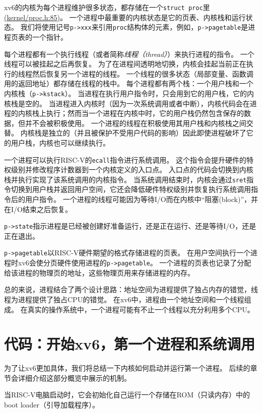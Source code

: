 xv6的内核为每个进程维护很多状态，都存储在一个\texttt{struct proc}里\href{https://github.com/mit-pdos/xv6-riscv/blob/riscv/kernel/proc.h#L85}{(kernel/proc.h:85)}。
一个进程中最重要的内核状态是它的页表、内核栈和运行状态。
我们将使用记号\texttt{p->xxx}来引用\texttt{proc}结构体的元素，例如，\texttt{p->pagetable}是进程页表的一个指针。

每个进程都有一个执行线程（或者简称\emph{线程（thread）}）来执行进程的指令。
一个线程可以被挂起之后再恢复。
为了在进程间透明地切换，内核会挂起当前正在执行的线程然后恢复另一个进程的线程。
一个线程的很多状态（局部变量、函数调用的返回地址）都存储在线程的栈中。
每个进程都有两个栈：一个用户栈和一个内核栈（\texttt{p->kstack}）。
当进程在执行用户指令时，只会用到它的用户栈，它的内核栈是空的。
当进程进入内核时（因为一次系统调用或者中断），内核代码会在进程的内核栈上执行；然而当一个进程在内核中时，它的用户栈仍然包含保存的数据，但并不会被积极使用。
一个进程的线程在积极使用其用户栈和内核栈之间交替。
内核栈是独立的（并且被保护不受用户代码的影响）因此即使进程破坏了它的用户栈，内核也可以继续执行。

一个进程可以执行RISC-V的\texttt{ecall}指令进行系统调用。
这个指令会提升硬件的特权级别并修改程序计数器到一个内核定义的入口点。
入口点的代码会切换到内核栈并执行实现了该系统调用的内核指令。
当系统调用结束时，内核会通过\texttt{sret}指令切换到用户栈并返回用户空间，它还会降低硬件特权级别并恢复执行系统调用指令后的用户指令。
一个进程的线程可能因为等待I/O而在内核中“阻塞(block)”，并在I/O结束之后恢复。

\texttt{p->state}指示进程是已经被创建好准备运行，还是正在运行、还是等待I/O，还是正在退出。

\texttt{p->pagetable}以RISC-V硬件期望的格式存储进程的页表。
在用户空间执行一个进程时xv6会使分页硬件使用进程的\texttt{p->pagetable}。
一个进程的页表也记录了分配给该进程的物理页的地址，这些物理页用来存储进程的内存。

总的来说，进程结合了两个设计思路：地址空间为进程提供了独占内存的错觉，线程为进程提供了独占CPU的错觉。
在xv6中，进程由一个地址空间和一个线程组成。
在真实的操作系统中，一个进程可能有不止一个线程以充分利用多个CPU。

\section{代码：开始xv6，第一个进程和系统调用}
为了让xv6更加具体，我们将总结一下内核如何启动并运行第一个进程。
后续的章节会详细介绍这部分概览中展示的机制。

当RISC-V电脑启动时，它会初始化自己运行一个存储在ROM（只读内存）中的boot loader（引导加载程序）。


